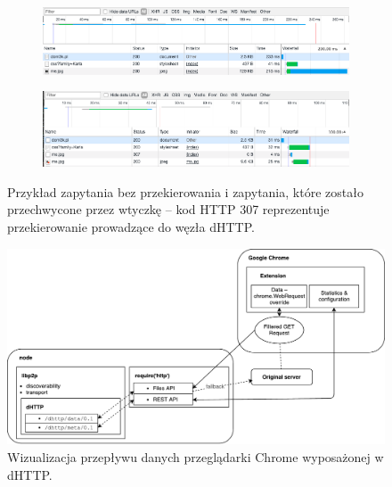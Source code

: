 \begin{figure}[h]
	\centering
	\begin{subfigure}{1\textwidth}
		\centering
		\includegraphics[scale=0.45]{no-redir.png}
		\subcaption{\label{subfigure_a}}
    \end{subfigure}
    \begin{subfigure}{1\textwidth}
		\centering
		\includegraphics[scale=0.45]{redir.png}
		\subcaption{\label{subfigure_b}}
	\end{subfigure}
	
	\caption{Przykład zapytania bez przekierowania \protect{} i zapytania, które zostało przechwycone przez wtyczkę \protect{} -- kod HTTP 307 reprezentuje przekierowanie prowadzące do węzła dHTTP.}

\end{figure}

\begin{figure}[h]
    \centering
    \includegraphics[scale=0.6]{client-flow.pdf}

    \caption{Wizualizacja przepływu danych przeglądarki Chrome wyposażonej w dHTTP.}
    \label{fig:client-flow}
\end{figure}

